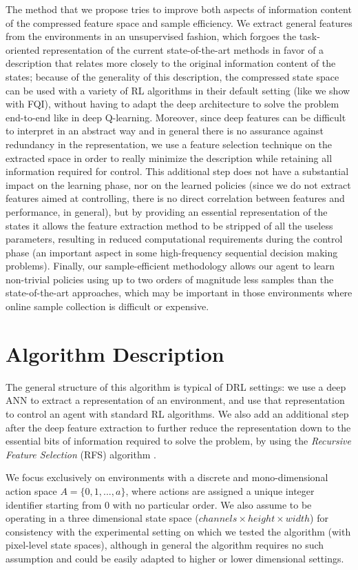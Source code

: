 The method that we propose tries to improve both aspects of information content
of the compressed feature space and sample efficiency. We extract general 
features from the environments in an unsupervised fashion, which forgoes the
task-oriented representation of the current state-of-the-art methods in favor of
a description that relates more closely to the original information content of 
the states; because of the generality of this description, the compressed state 
space can be used with a variety of RL algorithms in their default setting (like
we show with FQI), without having to adapt the deep architecture to solve the 
problem end-to-end like in deep Q-learning.
Moreover, since deep features can be difficult to interpret in an abstract 
way and in general there is no assurance against redundancy in the representation, 
we use a feature selection technique on the extracted space in order to 
really minimize the description while retaining all information required for 
control. This additional step does not have a substantial impact on the learning
phase, nor on the learned policies (since we do not extract features aimed at
controlling, there is no direct correlation between features and performance, in
general), but by providing an essential representation of the states it allows
the feature extraction method to be stripped of all the useless parameters, 
resulting in reduced computational requirements during the control phase (an 
important aspect in some high-frequency sequential decision making problems).
Finally, our sample-efficient methodology allows our agent to learn non-trivial 
policies using up to two orders of magnitude less samples than the 
state-of-the-art approaches, which may be important in those environments where 
online sample collection is difficult or expensive.

\section{Algorithm Description}
The general structure of this algorithm is typical of DRL settings: we use a 
deep ANN to extract a representation of an environment, and use that 
representation to control an agent with standard RL algorithms. We also add an 
additional step after the deep feature extraction to further reduce the 
representation down to the essential bits of information required to solve the 
problem, by using the \textit{Recursive Feature Selection} (RFS) algorithm 
\cite{castelletti2011tree}.

We focus exclusively on environments with a discrete and mono-dimensional 
action space $A = \{0, 1, ..., a\}$, where actions are assigned a unique integer 
identifier starting from $0$ with no particular order. 
We also assume to be operating in a three dimensional state space 
($channels \times height \times width$) for consistency with the experimental 
setting on which we tested the algorithm (with pixel-level state spaces), 
although in general the algorithm requires no such assumption and could be 
easily adapted to higher or lower dimensional settings. 

